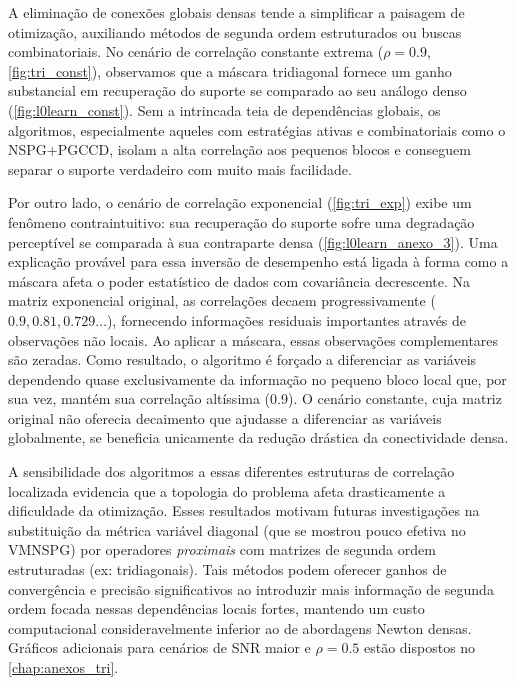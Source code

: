A eliminação de conexões globais densas tende a simplificar a paisagem de otimização, auxiliando métodos de segunda ordem estruturados ou buscas combinatoriais. No cenário de correlação constante extrema ($\rho=0.9$, \autoref{fig:tri_const}), observamos que a máscara tridiagonal fornece um ganho substancial em recuperação do suporte se comparado ao seu análogo denso (\autoref{fig:l0learn_const}). Sem a intrincada teia de dependências globais, os algoritmos, especialmente aqueles com estratégias ativas e combinatoriais como o NSPG+PGCCD, isolam a alta correlação aos pequenos blocos e conseguem separar o suporte verdadeiro com muito mais facilidade. 

Por outro lado, o cenário de correlação exponencial (\autoref{fig:tri_exp}) exibe um fenômeno contraintuitivo: sua recuperação do suporte sofre uma degradação perceptível se comparada à sua contraparte densa (\autoref{fig:l0learn_anexo_3}). Uma explicação provável para essa inversão de desempenho está ligada à forma como a máscara afeta o poder estatístico de dados com covariância decrescente. Na matriz exponencial original, as correlações decaem progressivamente ($0.9, 0.81, 0.729 \dots$), fornecendo informações residuais importantes através de observações não locais. Ao aplicar a máscara, essas observações complementares são zeradas. Como resultado, o algoritmo é forçado a diferenciar as variáveis dependendo quase exclusivamente da informação no pequeno bloco local que, por sua vez, mantém sua correlação altíssima (0.9). O cenário constante, cuja matriz original não oferecia decaimento que ajudasse a diferenciar as variáveis globalmente, se beneficia unicamente da redução drástica da conectividade densa.

A sensibilidade dos algoritmos a essas diferentes estruturas de correlação localizada evidencia que a topologia do problema afeta drasticamente a dificuldade da otimização. Esses resultados motivam futuras investigações na substituição da métrica variável diagonal (que se mostrou pouco efetiva no VMNSPG) por operadores \textit{proximais} com matrizes de segunda ordem estruturadas (ex: tridiagonais). Tais métodos podem oferecer ganhos de convergência e precisão significativos ao introduzir mais informação de segunda ordem focada nessas dependências locais fortes, mantendo um custo computacional consideravelmente inferior ao de abordagens Newton densas. Gráficos adicionais para cenários de SNR maior e $\rho=0.5$ estão dispostos no \autoref{chap:anexos_tri}.

